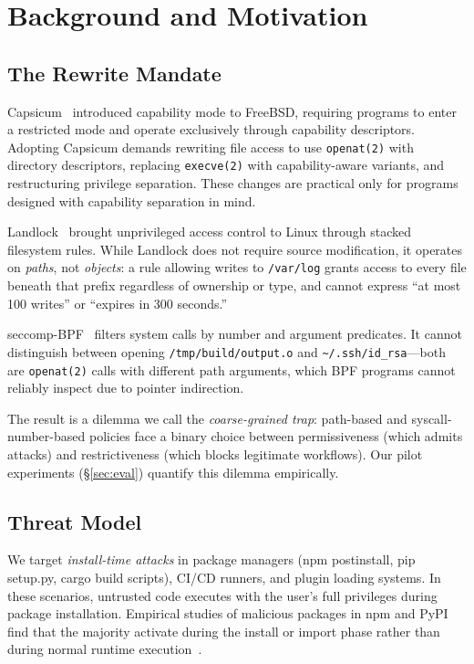 \documentclass[letterpaper,twocolumn,10pt]{article}
\begin{document}
\section{Background and Motivation}
\label{sec:bg}

\subsection{The Rewrite Mandate}

Capsicum~\cite{watson2010capsicum} introduced capability mode to
FreeBSD, requiring programs to enter a restricted mode and operate
exclusively through capability descriptors.  Adopting Capsicum demands
rewriting file access to use \texttt{openat(2)} with directory
descriptors, replacing \texttt{execve(2)} with capability-aware
variants, and restructuring privilege separation.  These changes are
practical only for programs designed with capability separation in mind.

Landlock~\cite{landlock2023} brought unprivileged access control to
Linux through stacked filesystem rules.  While Landlock does not
require source modification, it operates on \emph{paths}, not
\emph{objects}: a rule allowing writes to \texttt{/var/log} grants
access to every file beneath that prefix regardless of ownership or
type, and cannot express ``at most 100 writes'' or ``expires in 300
seconds.''

seccomp-BPF~\cite{seccomp2012} filters system calls by number and
argument predicates.  It cannot distinguish between opening
\texttt{/tmp/build/output.o} and \texttt{\~{}/.ssh/id\_rsa}---both are
\texttt{openat(2)} calls with different path arguments, which BPF
programs cannot reliably inspect due to pointer indirection.

The result is a dilemma we call the \emph{coarse-grained trap}: 
path-based and syscall-number-based policies face a binary choice
between permissiveness (which admits attacks) and restrictiveness
(which blocks legitimate workflows).  Our pilot experiments
(\S\ref{sec:eval}) quantify this dilemma empirically.

\subsection{Threat Model}

We target \emph{install-time attacks} in package managers (npm
postinstall, pip setup.py, cargo build scripts), CI/CD runners, and
plugin loading systems.  In these scenarios, untrusted code executes
with the user's full privileges during package installation.  Empirical
studies of malicious packages in npm and PyPI find that the majority
activate during the install or import phase rather than during normal
runtime execution~\cite{duan2021measuring,ohm2020backstabber,ladisa2023taxonomy}.
\end{document}
